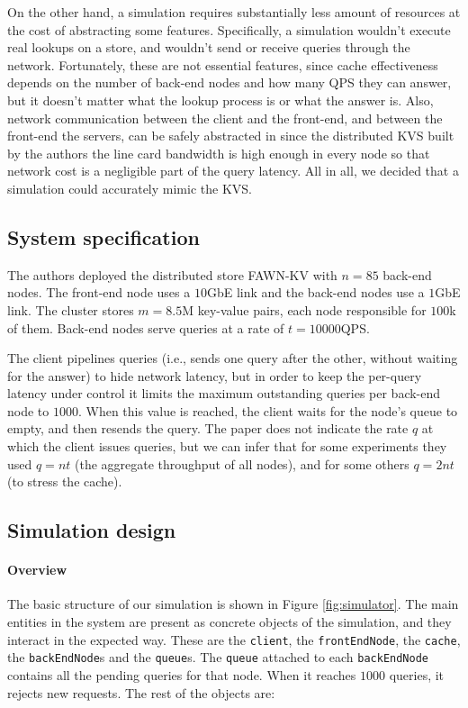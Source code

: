 \documentclass[10pt,letterpaper]{article}
\begin{document}
On the other hand, a simulation requires substantially less amount of resources at the cost of abstracting some features. Specifically, a simulation wouldn't execute real lookups on a store, and wouldn't send or receive queries through the network. Fortunately, these are not essential features, since cache effectiveness depends on the number of back-end nodes and how many QPS they can answer, but it doesn't matter what the lookup process is or what the answer is. Also, network communication between the client and the front-end, and between the front-end the servers, can be safely abstracted in since the distributed KVS built by the authors the line card bandwidth is high enough in every node so that network cost is a negligible part of the query latency. All in all, we decided that a simulation could accurately mimic the KVS.

\subsection{System specification}

The authors deployed the distributed store FAWN-KV \cite{Andersen09} with $n = 85$ back-end nodes. The front-end node uses a $10$GbE link and the back-end nodes use a $1$GbE link. The cluster stores $m = 8.5$M key-value pairs, each node responsible for $100$k of them. Back-end nodes serve queries at a rate of $t = 10000$QPS.

The client pipelines queries (i.e., sends one query after the other, without waiting for the answer) to hide network latency, but in order to keep the per-query latency under control it limits the maximum outstanding queries per back-end node to $1000$. When this value is reached, the client waits for the node's queue to empty, and then resends the query. The paper does not indicate the rate $q$ at which the client issues queries, but we can infer that for some experiments they used $q = nt$ (the aggregate throughput of all nodes), and for some others $q = 2nt$ (to stress the cache).

\subsection{Simulation design}

\paragraph{Overview}

The basic structure of our simulation is shown in Figure \ref{fig:simulator}. The main entities in the system are present as concrete objects of the simulation, and they interact in the expected way. These are the \texttt{client}, the \texttt{frontEndNode}, the \texttt{cache}, the \texttt{backEndNode}s and the \texttt{queue}s. The \texttt{queue} attached to each \texttt{backEndNode} contains all the pending queries for that node. When it reaches $1000$ queries, it rejects new requests. The rest of the objects are:
\end{document}
